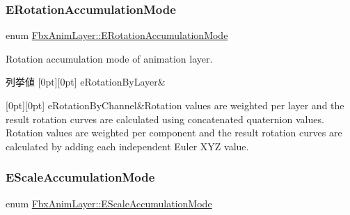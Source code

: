 \subsubsection{\texorpdfstring{E\+Rotation\+Accumulation\+Mode}{ERotationAccumulationMode}}
{\footnotesize\ttfamily enum \hyperlink{class_fbx_anim_layer_a11bad6dbac61cc3965624a0622e90b38}{Fbx\+Anim\+Layer\+::\+E\+Rotation\+Accumulation\+Mode}}

Rotation accumulation mode of animation layer. \begin{DoxyEnumFields}{列挙値}
[0pt][0pt]{}\mbox{\label{class_fbx_anim_layer_a11bad6dbac61cc3965624a0622e90b38a51036262864495602654d22f83f101da}} 
e\+Rotation\+By\+Layer&\\
\hline

[0pt][0pt]{}\mbox{\label{class_fbx_anim_layer_a11bad6dbac61cc3965624a0622e90b38a5212817a9e2cfdd21688930bd5fc167a}} 
e\+Rotation\+By\+Channel&Rotation values are weighted per layer and the result rotation curves are calculated using concatenated quaternion values. Rotation values are weighted per component and the result rotation curves are calculated by adding each independent Euler X\+YZ value. \\
\hline

\end{DoxyEnumFields}
\mbox{\label{class_fbx_anim_layer_aec9cfaa528bee6739ba4317964d123b0}} 
\subsubsection{\texorpdfstring{E\+Scale\+Accumulation\+Mode}{EScaleAccumulationMode}}
{\footnotesize\ttfamily enum \hyperlink{class_fbx_anim_layer_aec9cfaa528bee6739ba4317964d123b0}{Fbx\+Anim\+Layer\+::\+E\+Scale\+Accumulation\+Mode}}

